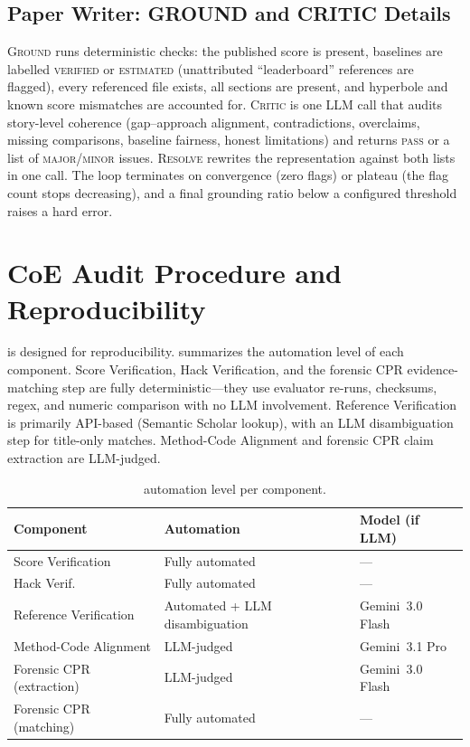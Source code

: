 \subsection{Paper Writer: GROUND and CRITIC Details}

\textsc{Ground} runs deterministic checks: the published score is present, baselines are labelled \textsc{verified} or \textsc{estimated} (unattributed ``leaderboard'' references are flagged), every referenced file exists, all sections are present, and hyperbole and known score mismatches are accounted for.
\textsc{Critic} is one LLM call that audits story-level coherence (gap--approach alignment, contradictions, overclaims, missing comparisons, baseline fairness, honest limitations) and returns \textsc{pass} or a list of \textsc{major}/\textsc{minor} issues.
\textsc{Resolve} rewrites the representation against both lists in one call.
The loop terminates on convergence (zero flags) or plateau (the flag count stops decreasing), and a final grounding ratio below a configured threshold raises a hard error.


\section{CoE Audit Procedure and Reproducibility}
\label{app:audit_implementation}

\coeaudit{} is designed for reproducibility.
 summarizes the automation level of each component.
Score Verification, Hack Verification, and the forensic CPR evidence-matching step are fully deterministic---they use evaluator re-runs, checksums, regex, and numeric comparison with no LLM involvement.
Reference Verification is primarily API-based (Semantic Scholar lookup), with an LLM disambiguation step for title-only matches.
Method-Code Alignment and forensic CPR claim extraction are LLM-judged.

\begin{table}[h]
\centering
\small
\caption{\coeaudit{} automation level per component.}
\label{tab:audit_procedure}
\begin{tabular}{@{}lll@{}}
\toprule
\textbf{Component} & \textbf{Automation} & \textbf{Model (if LLM)} \\
\midrule
Score Verification & Fully automated & --- \\
Hack Verif.\ & Fully automated & --- \\
Reference Verification & Automated + LLM disambiguation & Gemini~3.0 Flash \\
Method-Code Alignment & LLM-judged & Gemini~3.1 Pro \\
Forensic CPR (extraction) & LLM-judged & Gemini~3.0 Flash \\
Forensic CPR (matching) & Fully automated & --- \\
\bottomrule
\end{tabular}
\end{table}

